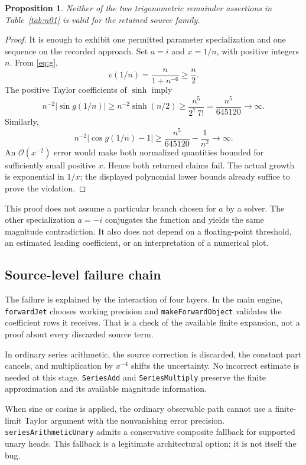 \documentclass[11pt,a4paper]{article}
\newtheorem{proposition}[theorem]{Proposition}
\newcommand{\OO}{\mathcal O}
\begin{document}
\begin{proposition}
Neither of the two trigonometric remainder assertions in Table~\ref{tab:n01} is valid for the retained source family.
\end{proposition}
\begin{proof}
It is enough to exhibit one permitted parameter specialization and one sequence on the recorded approach. Set $a=i$ and $x=1/n$, with positive integers $n$. From \eqref{eq:g},
\[
 v(1/n)=\frac{n}{1+n^{-6}}\ge\frac n2.
\]
The positive Taylor coefficients of $\sinh$ imply
\[
 n^{-2}|\sin g(1/n)|
 \ge n^{-2}\sinh(n/2)
 \ge \frac{n^5}{2^7\,7!}
 =\frac{n^5}{645120}\longrightarrow\infty.
\]
Similarly,
\[
 n^{-2}|\cos g(1/n)-1|
 \ge\frac{n^5}{645120}-\frac1{n^2}\longrightarrow\infty.
\]
An $\OO(x^{-2})$ error would make both normalized quantities bounded for sufficiently small positive $x$. Hence both returned claims fail. The actual growth is exponential in $1/x$; the displayed polynomial lower bounds already suffice to prove the violation.
\end{proof}

This proof does not assume a particular branch chosen for $a$ by a solver. The other specialization $a=-i$ conjugates the function and yields the same magnitude contradiction. It also does not depend on a floating-point threshold, an estimated leading coefficient, or an interpretation of a numerical plot.

\subsection{Source-level failure chain}
The failure is explained by the interaction of four layers. In the main engine, \texttt{forwardJet} chooses working precision and \texttt{makeForwardObject} validates the coefficient rows it receives. That is a check of the available finite expansion, not a proof about every discarded source term.\cite{core}

In ordinary series arithmetic, the source correction is discarded, the constant part cancels, and multiplication by $x^{-4}$ shifts the uncertainty. No incorrect estimate is needed at this stage. \texttt{SeriesAdd} and \texttt{SeriesMultiply} preserve the finite approximation and its available magnitude information.\cite{ops,arithmetic}

When sine or cosine is applied, the ordinary observable path cannot use a finite-limit Taylor argument with the nonvanishing error precision. \texttt{seriesArithmeticUnary} admits a conservative composite fallback for supported unary heads. This fallback is a legitimate architectural option; it is not itself the bug.\cite{arithmetic}
\end{document}
